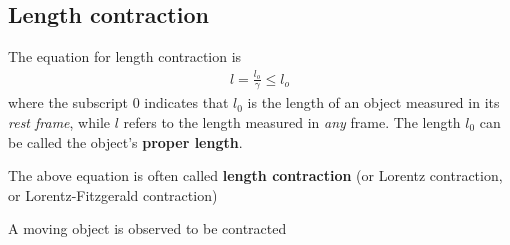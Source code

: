 \subsection{Length contraction}

The equation for length contraction is
\begin{align*}
    l = \frac{l_o}{\gamma} \leq l_o
\end{align*}
where the subscript 0 indicates that $l_0$ is the length of an object measured in its \textit{rest frame}, while $l$ refers to the length measured in \textit{any} frame. The length $l_0$ can be called the object's \textbf{proper length}.

The above equation is often called \textbf{length contraction} (or Lorentz contraction, or Lorentz-Fitzgerald contraction)

\begin{remark}
    A moving object is observed to be contracted
\end{remark}